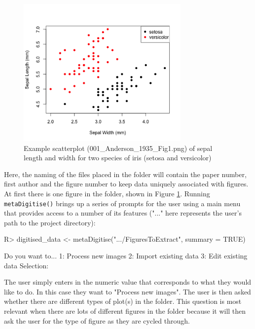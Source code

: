 \documentclass[12pt]{article}
\newcommand{\fct}[1]{\texttt{#1()}}
\begin{document}
\begin{figure}[!h]
\centering
 \includegraphics[width=0.75\textwidth]{001_Anderson_1935_Fig1.png} 
 \caption{Example scatterplot (001\_Anderson\_1935\_Fig1.png) of sepal length and width for two species of iris (setosa and versicolor)}
\label{fig:Anderson}
\end{figure}

Here, the naming of the files placed in the folder will contain the paper number, first author and the figure number to keep data uniquely associated with figures. At first there is one figure in the folder, shown in Figure \ref{fig:Anderson}. Running \fct{metaDigitise} brings up a series of prompts for the user using a main menu that provides access to a number of its features ("..." here represents the user's path to the project directory): 

\begin{CodeChunk}
\begin{CodeInput}
R> digitised_data <- metaDigitise(".../FiguresToExtract", summary = TRUE)
\end{CodeInput}
\begin{CodeOutput}
	Do you want to...
1: Process new images
2: Import existing data
3: Edit existing data
Selection: 
\end{CodeOutput}
\end{CodeChunk}

The user simply enters in the numeric value that corresponds to what they would like to do. In this case they want to "Process new images". The user is then asked whether there are different types of plot(s) in the folder. This question is most relevant when there are lots of different figures in the folder because it will then ask the user for the type of figure as they are cycled through.
\end{document}
